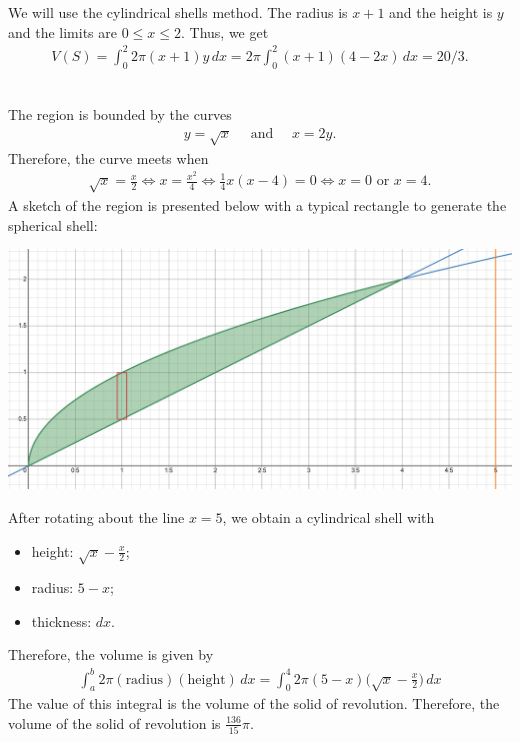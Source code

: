 	We will use the cylindrical shells method. The radius is $x + 1$ and the height is $y$ and the limits are $0 \leq x \leq 2$. Thus, we get
		\begin{align*}
		V(S) = \int_0^2 2\pi (x + 1) y \, dx = 2\pi \int_0^2 (x + 1) (4 - 2x) \, dx = 20/3 .
		\end{align*}
	
	\newpage
	
	\\
	The region is bounded by the curves
		\begin{align*}
		y = \sqrt{x} \quad \text{ and } \quad x = 2y .
		\end{align*}
	Therefore, the curve meets when
		\begin{align*}
		\sqrt{x} = \frac{x}{2} \iff x = \frac{x^2}{4} \iff \frac{1}{4} x (x- 4) = 0 \iff x = 0 \text{ or } x = 4 .
		\end{align*}
	A sketch of the region is presented below with a typical rectangle to generate the spherical shell:
	\begin{center}
	\includegraphics[scale=0.4]{fig5.png}
	\end{center}
	
	After rotating about the line $x = 5$, we obtain a cylindrical shell with
		\begin{itemize}
		\item height: $\sqrt{x} - \frac{x}{2}$;
		\item radius: $5 - x$;
		\item thickness: $dx$.
		\end{itemize}
	Therefore, the volume is given by
		\begin{align*}
		\int_a^b 2\pi (\text{radius}) (\text{height}) \, dx = \int_0^4 2\pi (5-x) \big(\sqrt{x} - \frac{x}{2} \big) \, dx
		\end{align*}
	The value of this integral is the volume of the solid of revolution. Therefore, the volume of the solid of revolution is $\frac{136}{15} \pi$.
	
